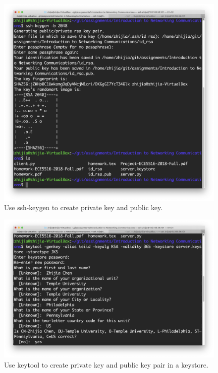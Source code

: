 \documentclass{article}
\begin{document}
\begin{figure}
    \centering
    \includegraphics[width=\linewidth]{fig/ssh-keygen.png}
    \caption{Use ssh-keygen to create private key and public key.
    } \label{fig:ssh-keygen}
\end{figure}

\begin{figure}
    \centering
    \includegraphics[width=\linewidth]{fig/keytool.png}
    \caption{Use keytool to create private key and public key pair in a keystore.
    } \label{fig:keytool}
\end{figure}
\end{document}
